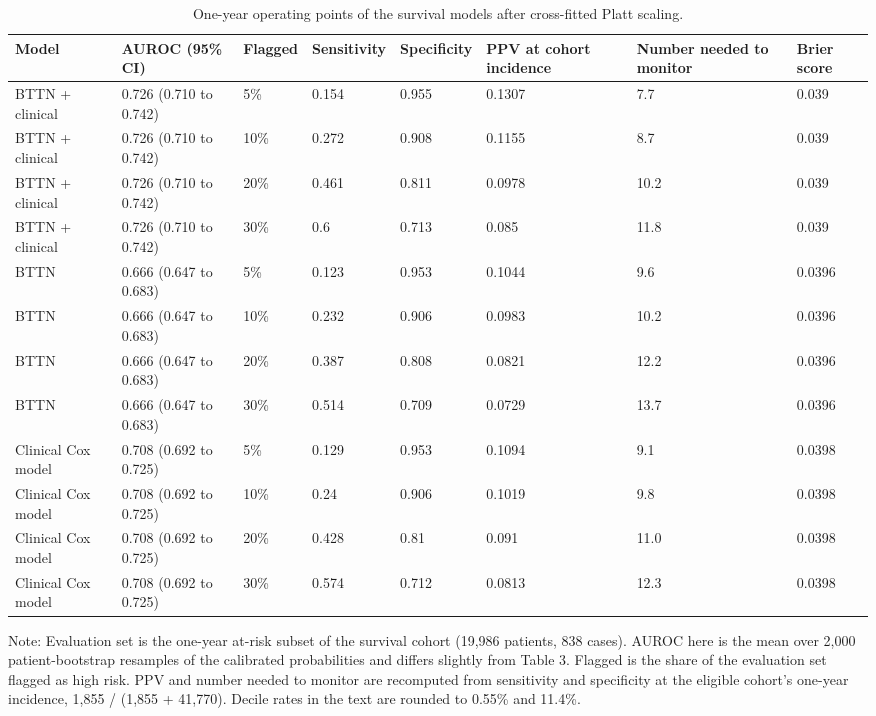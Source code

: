 \documentclass[preprint,12pt]{elsarticle}
\begin{document}
\begin{table}[htbp]
\centering
\scriptsize
\caption{One-year operating points of the survival models after cross-fitted Platt scaling.}
\label{tab:operating}
\begin{tabularx}{\textwidth}{@{}L{0.16\textwidth}YYYYYYY@{}}
\toprule
Model & AUROC (95\% CI) & Flagged & Sensitivity & Specificity & PPV at cohort incidence & Number needed to monitor & Brier score \\
\midrule
BTTN + clinical & 0.726 (0.710 to 0.742) & 5\% & 0.154 & 0.955 & 0.1307 & 7.7 & 0.039 \\
BTTN + clinical & 0.726 (0.710 to 0.742) & 10\% & 0.272 & 0.908 & 0.1155 & 8.7 & 0.039 \\
BTTN + clinical & 0.726 (0.710 to 0.742) & 20\% & 0.461 & 0.811 & 0.0978 & 10.2 & 0.039 \\
BTTN + clinical & 0.726 (0.710 to 0.742) & 30\% & 0.6 & 0.713 & 0.085 & 11.8 & 0.039 \\
BTTN & 0.666 (0.647 to 0.683) & 5\% & 0.123 & 0.953 & 0.1044 & 9.6 & 0.0396 \\
BTTN & 0.666 (0.647 to 0.683) & 10\% & 0.232 & 0.906 & 0.0983 & 10.2 & 0.0396 \\
BTTN & 0.666 (0.647 to 0.683) & 20\% & 0.387 & 0.808 & 0.0821 & 12.2 & 0.0396 \\
BTTN & 0.666 (0.647 to 0.683) & 30\% & 0.514 & 0.709 & 0.0729 & 13.7 & 0.0396 \\
Clinical Cox model & 0.708 (0.692 to 0.725) & 5\% & 0.129 & 0.953 & 0.1094 & 9.1 & 0.0398 \\
Clinical Cox model & 0.708 (0.692 to 0.725) & 10\% & 0.24 & 0.906 & 0.1019 & 9.8 & 0.0398 \\
Clinical Cox model & 0.708 (0.692 to 0.725) & 20\% & 0.428 & 0.81 & 0.091 & 11.0 & 0.0398 \\
Clinical Cox model & 0.708 (0.692 to 0.725) & 30\% & 0.574 & 0.712 & 0.0813 & 12.3 & 0.0398 \\
\bottomrule
\end{tabularx}

\smallskip
\raggedright
Note: Evaluation set is the one-year at-risk subset of the survival cohort (19,986 patients, 838 cases). AUROC here is the mean over 2,000 patient-bootstrap resamples of the calibrated probabilities and differs slightly from Table 3. Flagged is the share of the evaluation set flagged as high risk. PPV and number needed to monitor are recomputed from sensitivity and specificity at the eligible cohort's one-year incidence, 1,855 / (1,855 + 41,770). Decile rates in the text are rounded to 0.55\% and 11.4\%.
\end{table}
\end{document}
